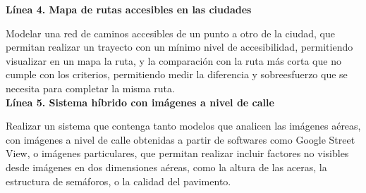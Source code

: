 \textbf{Línea 4. Mapa de rutas accesibles en las ciudades}

Modelar una red de caminos accesibles de un punto a otro de la ciudad, que permitan realizar un trayecto con un mínimo nivel de accesibilidad, permitiendo visualizar en un mapa la ruta, y la comparación con la ruta más corta que no cumple con los criterios, permitiendo medir la diferencia y sobreesfuerzo que se necesita para completar la misma ruta.
\\

\textbf{Línea 5. Sistema híbrido con imágenes a nivel de calle}

Realizar un sistema que contenga tanto modelos que analicen las imágenes aéreas, con imágenes a nivel de calle obtenidas a partir de softwares como Google Street View, o imágenes particulares, que permitan realizar incluir factores no visibles desde imágenes en dos dimensiones aéreas, como la altura de las aceras, la estructura de semáforos, o la calidad del pavimento.
\\